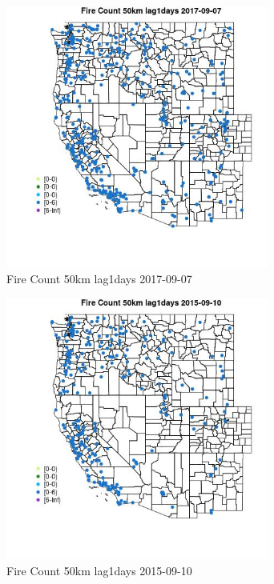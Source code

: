 \begin{figure} 
\centering  
\includegraphics[width=0.77\textwidth]{Code_Outputs/Report_ML_input_PM25_Step4_part_e_de_duplicated_aves_compiled_2019-05-20wNAs_MapObsFire_Count_50km_lag1days2017-09-07.jpg} 
\caption{\label{fig:Report_ML_input_PM25_Step4_part_e_de_duplicated_aves_compiled_2019-05-20wNAsMapObsFire_Count_50km_lag1days2017-09-07}Fire Count 50km lag1days 2017-09-07} 
\end{figure} 
 

\begin{figure} 
\centering  
\includegraphics[width=0.77\textwidth]{Code_Outputs/Report_ML_input_PM25_Step4_part_e_de_duplicated_aves_compiled_2019-05-20wNAs_MapObsFire_Count_50km_lag1days2015-09-10.jpg} 
\caption{\label{fig:Report_ML_input_PM25_Step4_part_e_de_duplicated_aves_compiled_2019-05-20wNAsMapObsFire_Count_50km_lag1days2015-09-10}Fire Count 50km lag1days 2015-09-10} 
\end{figure} 
 

